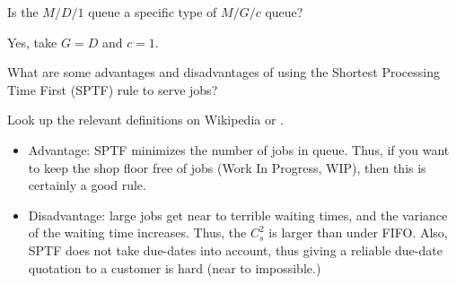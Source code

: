 \begin{exercise}
  Is the $M/D/1$ queue a specific type of  $M/G/c$ queue? 
  \begin{solution}
    Yes, take $G=D$ and $c=1$. 
  \end{solution}
\end{exercise}

\begin{exercise}
  What are some advantages and disadvantages of using the Shortest
  Processing Time First (SPTF) rule to serve jobs? 
  \begin{hint}
Look up the relevant
  definitions on Wikipedia or
  \citet{hall91:_queuein_method_servic_manuf}.
  \end{hint}
  \begin{solution}
  \begin{itemize}
  \item Advantage: SPTF minimizes the number of jobs in queue. Thus,
    if you want to keep the shop floor free of jobs (Work In Progress,
    WIP), then this is certainly a good rule. 
  \item Disadvantage: large jobs get near to terrible waiting times,
    and the variance of the waiting time increases. Thus, the $C_s^2$
    is larger than under FIFO. Also, SPTF does not take due-dates into
    account, thus giving a reliable due-date quotation to a customer is
    hard (near to impossible.)
  \end{itemize}
  \end{solution}
\end{exercise}





